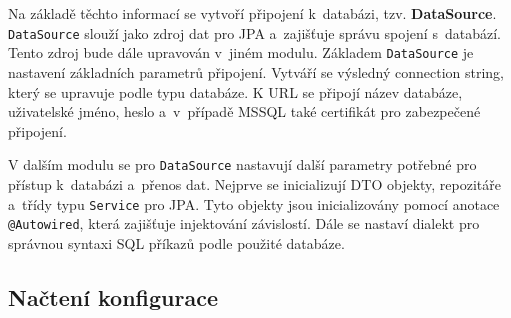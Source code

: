 Na základě těchto informací se vytvoří připojení k~databázi, tzv. \textbf{DataSource}.  
\texttt{DataSource} slouží jako zdroj dat pro JPA a~zajišťuje správu spojení s~databází.  
Tento zdroj bude dále upravován v~jiném modulu.  
Základem \texttt{DataSource} je nastavení základních parametrů připojení.  
Vytváří se výsledný connection string, který se upravuje podle typu databáze.  
K URL se připojí název databáze, uživatelské jméno, heslo a~v~případě MSSQL také certifikát pro zabezpečené připojení.

V dalším modulu se pro \texttt{DataSource} nastavují další parametry potřebné pro přístup k~databázi a~přenos dat.  
Nejprve se inicializují DTO objekty, repozitáře a~třídy typu \texttt{Service} pro JPA.  
Tyto objekty jsou inicializovány pomocí anotace \texttt{@Autowired}, která zajišťuje injektování závislostí.  
Dále se nastaví dialekt pro správnou syntaxi SQL příkazů podle použité databáze.

\subsection{Načtení konfigurace}
\label{sec:konfigurace}

